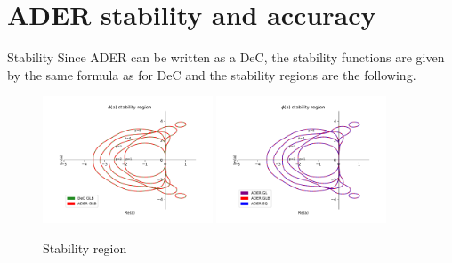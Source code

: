 \documentclass[aspectratio=169]{beamer}
\begin{document}
\section{ADER stability and accuracy}
\begin{frame}{Stability}
	Since ADER can be written as a DeC, the stability functions are 
	given by the same formula as for DeC and the stability regions are the following.
	\begin{figure}[h] 
		\centering
		\includegraphics[width=0.45\textwidth, trim={30 20 30 20},clip]{stab_glb.pdf}
		\includegraphics[width=0.45\textwidth, trim={30 20 30 20},clip]{ader_all.pdf}
		\caption{Stability region}
		\label{fig:stab}
	\end{figure}
\end{frame}
\end{document}
